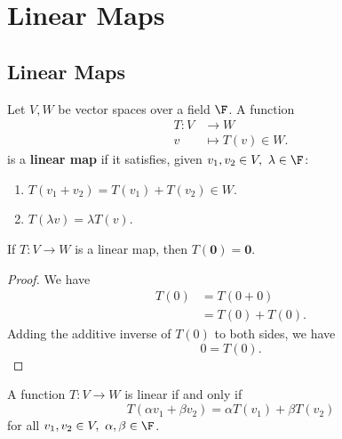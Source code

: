 \documentclass[math0540-lecture-notes.tex]{subfiles}
\begin{document}
\chapter{Linear Maps}

\section{Linear Maps}
\begin{definition}{}
  Let $V,W$ be vector spaces over a field $\F$. A function \begin{align*}
    T: V &\longrightarrow W \\
    v &\longmapsto T(v) \in W
  .\end{align*} is a \textbf{linear map}
  if it satisfies, given $v_1,v_2\in V,\ \lambda\in \F$:
  \begin{enumerate}
    \item $T(v_1+v_2) = T(v_1)+T(v_2)\in W$.
    \item $T(\lambda v)=\lambda T(v)$.
  \end{enumerate}
\end{definition}

\begin{proposition}{}
  If $T:V\to W$ is a linear map, then $T(\textbf{0})=\textbf{0}$.
\end{proposition}
\begin{proof}[Proof]
  We have
  \begin{align*}
    T(0) &= T(0+0) \\
         &= T(0)+T(0)
       .\end{align*} Adding the additive inverse of $T(0)$ to both sides, we have  \[
       0 = T(0)
       .\] 
\end{proof}

\begin{proposition}{}
  A function $T:V\to W$ is linear if and only if \[
    T(\alpha v_1 + \beta v_2) = \alpha T(v_1) + \beta T(v_2)
  \]  for all $ v_1,v_2\in V,\ \alpha,\beta\in \F$.
\end{proposition}
\end{document}
